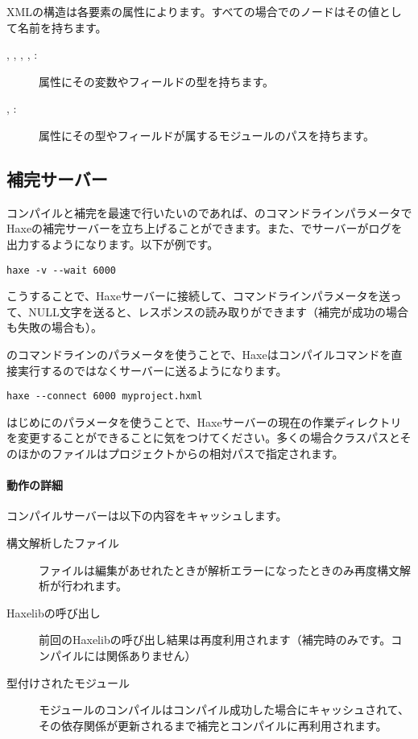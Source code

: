 XMLの構造は各要素の属性によります。すべての場合でのノードはその値として名前を持ちます。

\begin{description}
	\item[, , , , :] 属性にその変数やフィールドの型を持ちます。
	\item[, :] 属性にその型やフィールドが属するモジュールのパスを持ちます。
\end{description}

\subsection{補完サーバー}
\label{cr-completion-server}

コンパイルと補完を最速で行いたいのであれば、のコマンドラインパラメータでHaxeの補完サーバーを立ち上げることができます。また、でサーバーがログを出力するようになります。以下が例です。

\begin{lstlisting}
haxe -v --wait 6000
\end{lstlisting}

こうすることで、Haxeサーバーに接続して、コマンドラインパラメータを送って、NULL文字を送ると、レスポンスの読み取りができます（補完が成功の場合も失敗の場合も）。

のコマンドラインのパラメータを使うことで、Haxeはコンパイルコマンドを直接実行するのではなくサーバーに送るようになります。

\begin{lstlisting}
haxe --connect 6000 myproject.hxml
\end{lstlisting}

はじめにのパラメータを使うことで、Haxeサーバーの現在の作業ディレクトリを変更することができることに気をつけてください。多くの場合クラスパスとそのほかのファイルはプロジェクトからの相対パスで指定されます。

\paragraph{動作の詳細}

コンパイルサーバーは以下の内容をキャッシュします。

\begin{description}
	\item[構文解析したファイル] ファイルは編集があせれたときが解析エラーになったときのみ再度構文解析が行われます。
	\item[Haxelibの呼び出し] 前回のHaxelibの呼び出し結果は再度利用されます（補完時のみです。コンパイルには関係ありません）
	\item[型付けされたモジュール] モジュールのコンパイルはコンパイル成功した場合にキャッシュされて、その依存関係が更新されるまで補完とコンパイルに再利用されます。
\end{description}

